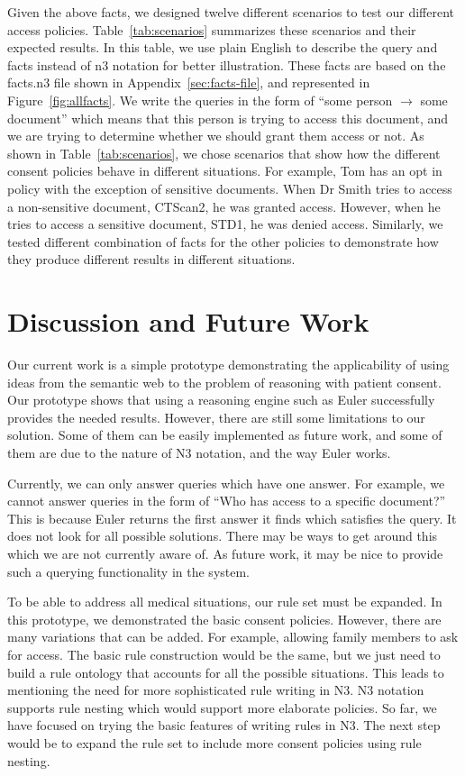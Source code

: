 \documentclass[conference]{IEEEtran}
\begin{document}
Given the above facts, we designed twelve different scenarios to test our different access policies. Table~\ref{tab:scenarios} summarizes these scenarios and
their expected results. In this table, we use plain English to describe the query and facts instead of n3 notation for better illustration. These facts are
based on the facts.n3 file shown in Appendix~\ref{sec:facts-file}, and represented in Figure~\ref{fig:allfacts}. We write the queries in the form of ``some
person $\rightarrow$ some document'' which means that this person is trying to
access this document, and we are trying to determine whether we should grant them access or not. As shown in Table~\ref{tab:scenarios}, we chose scenarios that
show how the different consent policies behave in different situations. For example, Tom has an opt in policy with the exception of sensitive documents. When
Dr Smith tries to access a non-sensitive document, CTScan2, he was granted access. However, when he tries to access a sensitive document, STD1, he was denied
access. Similarly, we tested different combination of facts for the other policies to demonstrate how they produce different results in different situations.


\section{Discussion and Future Work}
\label{sec:discFuture}

Our current work is a simple prototype demonstrating the applicability of using ideas from the semantic web to the problem of reasoning with patient consent.
Our prototype shows that using a reasoning engine such as Euler successfully provides the needed results. However, there are still some limitations to our
solution. Some of them can be easily implemented as future work, and some of them are due to the nature of N3 notation, and the way Euler works. 

Currently, we can only answer queries which have one answer. For example, we cannot answer queries in the form of ``Who has access to a specific document?''
This is because
Euler returns the first answer it finds which satisfies the query. It does not look for all possible solutions. There may be ways to get around this which we
are not currently aware of. As future work, it may be nice to provide such a querying functionality in the system.

To be able to address all medical situations, our rule set must be expanded. In this prototype, we demonstrated the basic consent policies. However, there are
many variations that can be added. For example, allowing family members to ask for access. The basic rule construction would be the same, but we just need to
build a rule ontology that accounts for all the possible situations. This leads to mentioning the need for more sophisticated rule writing in N3. N3
notation supports rule nesting which would support more elaborate policies. So far, we have focused on trying the basic features of writing
rules in N3. The next step would be to expand the rule set to include more consent policies using rule nesting.
\end{document}
